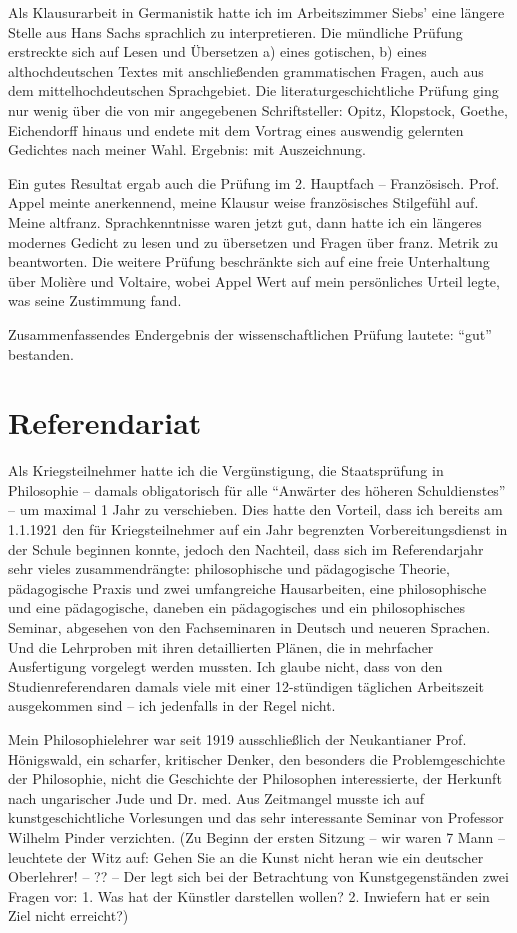 Als Klausurarbeit in Germanistik hatte ich im Arbeitszimmer Siebs' eine längere Stelle aus Hans Sachs sprachlich zu interpretieren. Die mündliche Prüfung erstreckte sich auf Lesen und Übersetzen a) eines gotischen, b) eines althochdeutschen Textes mit anschließenden grammatischen Fragen, auch aus dem mittelhochdeutschen Sprachgebiet. Die literaturgeschichtliche Prüfung ging nur wenig über die von mir angegebenen Schriftsteller: Opitz, Klopstock, Goethe, Eichendorff hinaus und endete mit dem Vortrag eines auswendig gelernten Gedichtes nach meiner Wahl. Ergebnis: mit Auszeichnung.

Ein gutes Resultat ergab auch die Prüfung im 2. Hauptfach -- Französisch. Prof. Appel meinte anerkennend, meine Klausur weise französisches Stilgefühl auf. Meine altfranz. Sprachkenntnisse waren jetzt gut, dann hatte ich ein längeres modernes Gedicht zu lesen und zu übersetzen und Fragen über franz. Metrik zu beantworten. Die weitere Prüfung beschränkte sich auf eine freie Unterhaltung über Molière und Voltaire, wobei Appel Wert auf mein persönliches Urteil legte, was seine Zustimmung fand.

Zusammenfassendes Endergebnis der wissenschaftlichen Prüfung lautete: \enquote{gut} bestanden.

\section{Referendariat}
Als Kriegsteilnehmer hatte ich die Vergünstigung, die Staatsprüfung in Philosophie -- damals obligatorisch für alle \enquote{Anwärter des höheren Schuldienstes} -- um maximal 1 Jahr zu verschieben. Dies hatte den Vorteil, dass ich bereits am 1.1.1921 den für Kriegsteilnehmer auf ein Jahr begrenzten Vorbereitungsdienst in der Schule beginnen konnte, jedoch den Nachteil, dass sich im Referendarjahr sehr vieles zusammendrängte: philosophische und pädagogische Theorie, pädagogische Praxis und zwei umfangreiche Hausarbeiten, eine philosophische und eine pädagogische, daneben ein pädagogisches und ein philosophisches Seminar, abgesehen von den Fachseminaren in Deutsch und neueren Sprachen. Und die Lehrproben mit ihren detaillierten Plänen, die in mehrfacher Ausfertigung vorgelegt werden mussten. Ich glaube nicht, dass von den Studienreferendaren damals viele mit einer 12-stündigen täglichen Arbeitszeit ausgekommen sind -- ich jedenfalls in der Regel nicht.

Mein Philosophielehrer war seit 1919 ausschließlich der Neukantianer Prof. Hönigswald, ein scharfer, kritischer Denker, den besonders die Problemgeschichte der Philosophie, nicht die Geschichte der Philosophen interessierte, der Herkunft nach ungarischer Jude und Dr. med. Aus Zeitmangel musste ich auf kunstgeschichtliche Vorlesungen und das sehr interessante Seminar von Professor Wilhelm Pinder verzichten. (Zu Beginn der ersten Sitzung -- wir waren 7 Mann -- leuchtete der Witz auf: Gehen Sie an die Kunst nicht heran wie ein deutscher Oberlehrer! -- ?? -- Der legt sich bei der Betrachtung von Kunstgegenständen zwei Fragen vor: 1. Was hat der Künstler darstellen wollen? 2. Inwiefern hat er sein Ziel nicht erreicht?)

